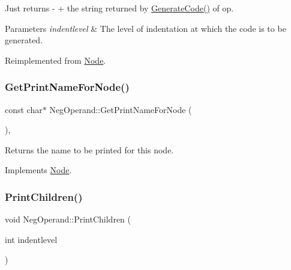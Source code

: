 Just returns \textquotesingle{}-\/\textquotesingle{} + the string returned by \hyperlink{class_neg_operand_ab205694eabcb30ce4b70e80022b1e751}{Generate\+Code()} of op. 
\begin{DoxyParams}{Parameters}
{\em indentlevel} & The level of indentation at which the code is to be generated. \\
\hline
\end{DoxyParams}


Reimplemented from \hyperlink{class_node_acb60e526730e8436056375a3055c2c32}{Node}.

\mbox{\label{class_neg_operand_affbee1241ab0faee9839aa89bdba449d}} 
\subsubsection{\texorpdfstring{Get\+Print\+Name\+For\+Node()}{GetPrintNameForNode()}}
{\footnotesize\ttfamily const char$\ast$ Neg\+Operand\+::\+Get\+Print\+Name\+For\+Node (\begin{DoxyParamCaption}{ }\end{DoxyParamCaption})\hspace{0.3cm}{\ttfamily [inline]}, {\ttfamily [virtual]}}

Returns the name to be printed for this node. 

Implements \hyperlink{class_node_a56e29657306ffb004d69c6929ae44269}{Node}.

\mbox{\label{class_neg_operand_a03ac72f86e78b28781a8a54dd4789ee9}} 
\subsubsection{\texorpdfstring{Print\+Children()}{PrintChildren()}}
{\footnotesize\ttfamily void Neg\+Operand\+::\+Print\+Children (\begin{DoxyParamCaption}\item[{int}]{indentlevel }\end{DoxyParamCaption})\hspace{0.3cm}{\ttfamily [virtual]}}

